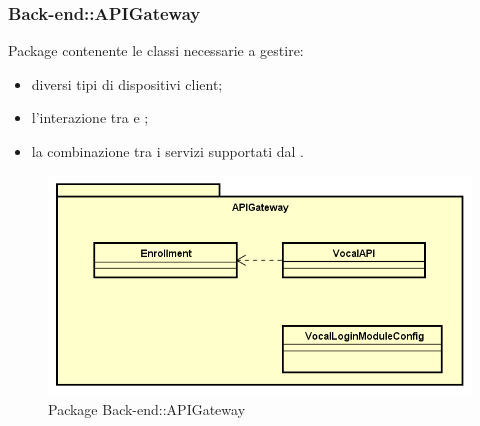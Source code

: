 \subsubsection{Back-end::APIGateway}
Package contenente le classi necessarie a gestire:
\begin{itemize}
 \item diversi tipi di  dispositivi client;
 \item l'interazione tra  e ;
 \item la combinazione tra i servizi supportati dal .
\end{itemize}
\begin{figure}[h] \centering \includegraphics[width=\textwidth,height=\textheight,keepaspectratio]{images/diagrams/back-end/Official_Backend_0304/APIGateway.png}
	\caption{Package Back-end::APIGateway}
\end{figure}
\newpage

